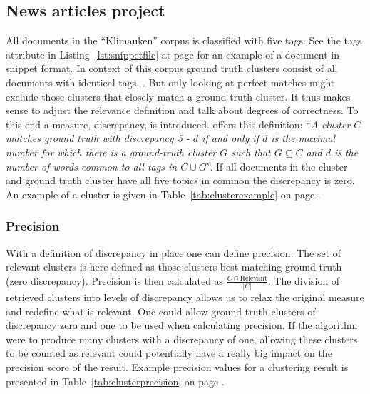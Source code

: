 \subsection{News articles project}
All documents in the ``Klimauken'' corpus is classified with five tags. See the tags attribute in Listing~\ref{lst:snippetfile} at page \pageref{lst:snippetfile} for an example of a document in snippet format. In context of this corpus ground truth clusters consist of all documents with identical tags, \parencite{Moe2014}. But only looking at perfect matches might exclude those clusters that closely match a ground truth cluster. It thus makes sense to adjust the relevance definition and talk about degrees of correctness. To this end a measure, discrepancy, is introduced. \cite[][666]{Moe2014} offers this definition: ``\textit{A cluster \(C\) matches ground truth with discrepancy 5 - \(d\) if and only if \(d\) is the maximal number for which there is a ground-truth cluster \(G\) such that \(G \subseteq C\) and \(d\) is the number of words common to all tags in \(C \cup G\)}''. If all documents in the cluster and ground truth cluster have all five topics in common the discrepancy is zero. An example of a cluster is given in Table~\ref{tab:clusterexample} on page \pageref{tab:clusterexample}.

\subsubsection{Precision}
With a definition of discrepancy in place one can define precision. The set of relevant clusters is here defined as those clusters best matching ground truth (zero discrepancy). Precision is then calculated as \(\frac{C \cap \text{Relevant}}{\vert C \vert}\). The division of retrieved clusters into levels of discrepancy allows us to relax the original measure and redefine what is relevant. One could allow ground truth clusters of discrepancy zero and one to be used when calculating precision. If the algorithm were to produce many clusters with a discrepancy of one, allowing these clusters to be counted as relevant could potentially have a really big impact on the precision score of the result. Example precision values for a clustering result is presented in Table~\ref{tab:clusterprecision} on page \pageref{tab:clusterprecision}.

